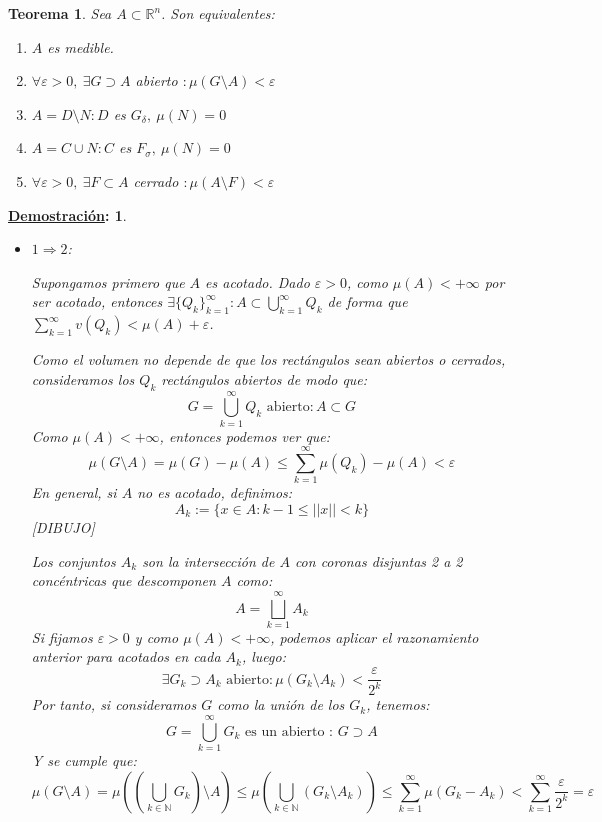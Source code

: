 \documentclass[10pt,a4paper,openright]{book}
\theoremstyle{break}
\newtheorem*{theo}{Teorema}
\newtheorem*{demo}{\underline{Demostración}:}
\begin{document}
\begin{theo}
Sea $A \subset \mathbb{R}^n$. Son equivalentes:  
\begin{enumerate}
\item $A$ es medible.
\item $\forall \varepsilon > 0,\ \exists G \supset A$ abierto $: \mu\left( G\setminus A  \right) < \varepsilon$  
\item $A = D \setminus N: D$ es $G_{\delta},\ \mu\left( N \right) = 0$  
\item $A = C \cup N: C$ es $F_{\sigma},\ \mu\left( N \right) = 0$  
\item $\forall \varepsilon > 0,\ \exists F \subset A$ cerrado $: \mu\left( A \setminus F \right) < \varepsilon$  
\end{enumerate}
\end{theo}
\begin{demo}
\begin{itemize}
\item $1 \Rightarrow 2$:

Supongamos primero que $A$ es acotado. Dado $\varepsilon > 0$, como $\mu\left( A \right) < +\infty$ por ser acotado, entonces $\exists \{Q_k\}_{k=1}^{\infty} : A \subset \displaystyle \bigcup_{k=1}^\infty Q_k$ de forma que $\sum_{k=1}^{\infty} v\left( Q_k \right) < \mu\left( A \right) + \varepsilon$. 

Como el volumen no depende de que los rectángulos sean abiertos o cerrados, consideramos los $Q_k$ rectángulos abiertos de modo que:
$$G = \bigcup_{k=1}^{\infty} Q_k \mbox{ abierto} : A\subset G$$
Como $\mu (A) < + \infty$, entonces podemos ver que:
$$\mu\left( G \setminus A \right) = \mu\left( G \right) - \mu\left( A \right) \le \sum_{k=1}^{\infty} \mu\left( Q_k \right) - \mu\left( A \right) < \varepsilon $$ 
En general, si $A$ no es acotado, definimos: 
$$A_k := \{x \in A: k - 1 \le \vert \vert x \vert  \vert < k \}$$
[DIBUJO]

Los conjuntos $A_k$ son la intersección de $A$ con coronas disjuntas 2 a 2 concéntricas que descomponen $A$ como:
$$ A = \bigsqcup_{k=1}^{\infty}A_k$$ 
Si fijamos $\varepsilon > 0$ y como $\mu\left( A \right) < +\infty$, podemos aplicar el razonamiento anterior para acotados en cada $A_k$, luego:
$$\exists G_k \supset A_k \text{ abierto} : \mu\left( G_k \setminus A_k \right) < \frac{\varepsilon}{2^k}$$
Por tanto, si consideramos $G$ como la unión de los $G_k$, tenemos:
$$G = \bigcup_{k=1}^{\infty}G_k \text{ es un abierto : } G \supset A$$ 
Y se cumple que:
$$\mu\left( G \setminus A \right) = \mu\left( \left( \bigcup_{k \in \mathbb{N}}G_k  \right) \setminus A   \right) \le \mu\left(  \bigcup_{k \in \mathbb{N}} \left(G_k \setminus A_k  \right)  \right) \le \sum_{k=1}^{\infty} \mu\left( G_k - A_k \right) < \sum_{k=1}^{\infty} \frac{\varepsilon}{2^k} = \varepsilon $$ 


\end{itemize}
\end{demo}
\end{document}
